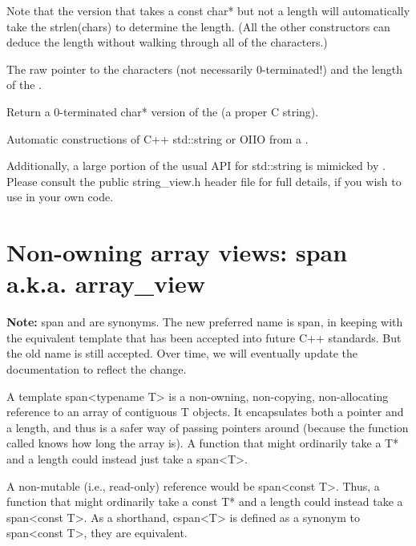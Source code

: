 Note that the version that takes a {\cf const char*} but not a length will
automatically take the {\cf strlen(chars)} to determine the length.  (All
the other constructors can deduce the length without walking through all
of the characters.)
\apiend

The raw pointer to the characters (not necessarily 0-terminated!)
and the length of the \stringview.
\apiend

Return a 0-terminated {\cf char*} version of the \stringview (a proper C
string).
\apiend

Automatic constructions of C++ {\cf std::string} or OIIO \ustring from
a \stringview.
\apiend

\smallskip
\noindent Additionally, a large portion of the usual API for {\cf std::string}
is mimicked by \stringview.  Please consult the public {\cf string_view.h}
header file for full details, if you wish to use \stringview in your own
code.


\section{Non-owning array views: {\cf span} a.k.a. {\cf array\_view}}
\label{sec:span} \label{sec:arrayview}
 

{\bf Note:} {\cf span} and \arrayview are synonyms. The new preferred name is
{\cf span}, in keeping with the equivalent template that has been accepted into
future C++ standards. But the old name \arrayview is still accepted. Over
time, we will eventually update the documentation to reflect the change.

A {\cf template span<typename T>} is a non-owning, non-copying,
non-allocating reference to an array of contiguous {\cf T} objects.  It
encapsulates both a pointer and a length, and thus is a safer way of passing
pointers around (because the function called knows how long the array is). A
function that might ordinarily take a {\cf T*} and a length could instead
just take a {\cf span<T>}.

A non-mutable (i.e., read-only) reference would be {\cf span<const T>}.
Thus, a function that might ordinarily take a {\cf const T*} and a length
could instead take a {\cf span<const T>}. As a shorthand, {\cf cspan<T>} is
defined as a synonym to {\cf span<const T>}, they are equivalent.

